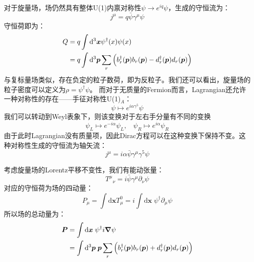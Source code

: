 对于旋量场，场仍然具有整体U(1)内禀对称性$\psi\rightarrow e^{iq}\psi$，生成的守恒流为：
\begin{equation}
j^\mu=q\bar{\psi}\gamma^\mu\psi
\end{equation}
守恒荷即为：
\begin{align}
Q&=q\int\mathrm{d}^3\boldsymbol{x}\psi^\dagger(x)\psi(x)\notag\\
&=q\int\mathrm{d}^3\boldsymbol{p}\sum_{r}\Big(b^\dagger_r(\boldsymbol{p})b_r(\boldsymbol{p})-d^\dagger_r(\boldsymbol{p})d_r(\boldsymbol{p})\Big)
\end{align}
与复标量场类似，存在负定的粒子数荷，即为反粒子。我们还可以看出，旋量场的粒子密度可以定义为$\rho = \psi^\dagger\psi$。
而对于无质量的Fermion而言，Lagrangian还允许一种对称性的存在——手征对称性U(1)$_A$：
\begin{equation}
\psi\mapsto e^{i\alpha\gamma^5}\psi
\end{equation}
我们可以转动到Weyl表象下，则该变换对于左右手分量有不同的变换
\begin{equation}
    \psi_L\mapsto e^{-i\alpha} \psi_L,~~~~\psi_R\mapsto e^{i\alpha} \psi_R
\end{equation}
由于此时Lagrangian没有质量项，因此Dirac方程可以在这种变换下保持不变。这种对称性生成的守恒流为轴矢流：
\begin{equation}
j^\mu=i\alpha\bar{\psi}\gamma^\mu\gamma^5\psi
\end{equation}

考虑旋量场的Lorentz平移不变性，我们有能动张量：
\begin{equation}
{T^\mu}_\nu=i\bar{\psi}\gamma^\mu\partial_\nu\psi
\end{equation}
对应的守恒荷为场的四动量：
\begin{equation}
P_\mu=\int\mathrm{d}\boldsymbol{x}T^0_\mu=i\int\mathrm{d}\boldsymbol{x}\;\psi^\dagger\partial_\mu\psi
\end{equation}
所以场的总动量为：
\begin{align}
\boldsymbol{P}&=\int\mathrm{d}\boldsymbol{x}\;\psi^\dagger i\boldsymbol{\nabla}\psi\notag\\
&=\int\mathrm{d}^3\boldsymbol{p}\; \boldsymbol{p}\sum_{r}\Big(b^\dagger_r(\boldsymbol{p})b_r(\boldsymbol{p})+d^\dagger_r(\boldsymbol{p})d_r(\boldsymbol{p})\Big)
\end{align}

